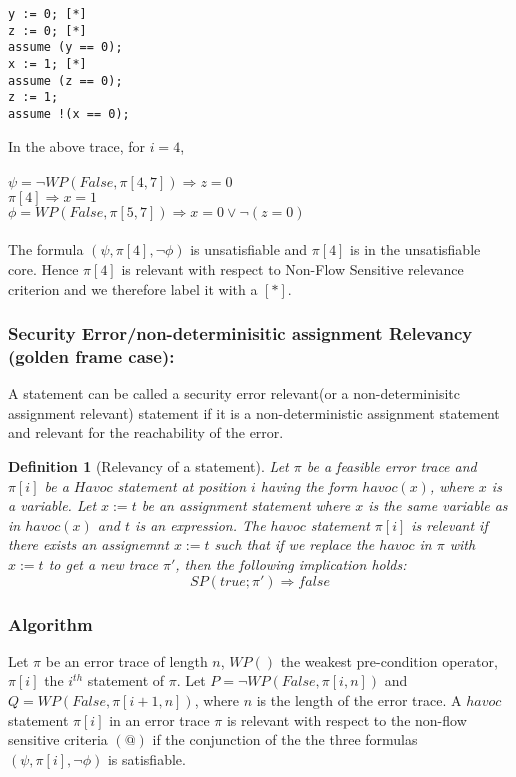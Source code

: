 \documentclass{article}
\newtheorem{mydef}{Definition}
\begin{document}
\begin{lstlisting}
y := 0; [*]
z := 0; [*]
assume (y == 0);
x := 1; [*]
assume (z == 0);
z := 1;
assume !(x == 0);
\end{lstlisting}
In the above trace, for $i=4$,\\
\\
$\psi = \neg WP(False, \pi[4,7]) \Longrightarrow z=0$\\
$\pi[4] \Longrightarrow x=1$\\
$\phi =  WP(False, \pi[5,7]) \Longrightarrow x=0 \vee \neg(z=0)$\\
\\
The formula $(\psi,\pi[4],\neg \phi)$ is unsatisfiable and $\pi[4]$ is in the unsatisfiable core. Hence $\pi[4]$ is relevant with respect to Non-Flow Sensitive relevance criterion and we therefore label it with a $[*]$.
\subsubsection{Security Error/non-determinisitic assignment Relevancy (golden frame case):}
A statement can be called a security error relevant(or a non-determinisitc assignment relevant) statement if it is a non-deterministic assignment statement and relevant for the reachability of the error.

\begin{mydef}[Relevancy of a statement]
Let $\pi$ be a feasible error trace and $\pi[i]$ be a $Havoc$ statement at position $i$ having the form $havoc(x)$, where $x$ is a variable. Let $x:=t$ be an assignment statement where $x$ is the same variable as in $havoc(x)$ and $t$ is an expression. The $havoc$ statement $\pi[i]$ is relevant if there exists an assignemnt $x:=t$ such that if we replace the $havoc$ in $\pi$ with $x:=t$ to get a new trace $\pi'$, then the following implication holds:
$$SP(true; \pi') \Rightarrow false$$
\end{mydef}

\subsubsection*{Algorithm}
Let $\pi$ be an error trace of length $n$, $WP()$ the weakest pre-condition operator, $\pi[i]$ the $i^{th}$ statement of $\pi$. Let $P = \neg WP(False, \pi[i,n])$ and $Q =  WP(False, \pi[i+1,n])$, where $n$ is the length of the error trace. A $havoc$ statement $\pi[i]$ in an error trace $\pi$ is relevant with respect to the non-flow sensitive criteria $(@)$ if the conjunction of the the three formulas $(\psi,\pi[i],\neg \phi) $ is satisfiable.\\
\end{document}
